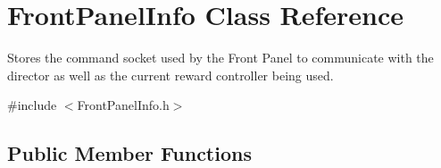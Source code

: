 \hypertarget{class_front_panel_info}{\section{Front\-Panel\-Info Class Reference}
\label{class_front_panel_info}
}


Stores the command socket used by the Front Panel to communicate with the director as well as the current reward controller being used.  




{\ttfamily \#include $<$Front\-Panel\-Info.\-h$>$}

\subsection*{Public Member Functions}
